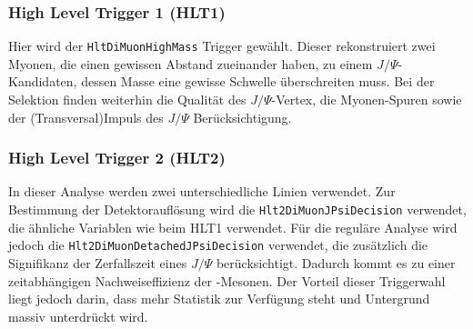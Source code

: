 \subsubsection{High Level Trigger 1 (HLT1)}
Hier wird der \texttt{HltDiMuonHighMass} Trigger gewählt. Dieser rekonstruiert zwei Myonen, die einen gewissen Abstand zueinander haben, zu einem $J/\Psi$-Kandidaten, dessen Masse eine gewisse Schwelle überschreiten muss. Bei der Selektion finden weiterhin die Qualität des $J/\Psi$-Vertex, die Myonen-Spuren sowie der (Transversal)Impuls des $J/\Psi$ Berücksichtigung.

\subsubsection{High Level Trigger 2 (HLT2)}
In dieser Analyse werden zwei unterschiedliche Linien verwendet. Zur Bestimmung der Detektorauflösung wird die \texttt{Hlt2\-DiMuon\-JPsi\-Decision} verwendet, die ähnliche Variablen wie beim HLT1 verwendet. Für die reguläre Analyse wird jedoch die \texttt{Hlt2\-DiMuon\-Detached\-JPsi\-Decision} verwendet, die zusätzlich die Signifikanz der Zerfallszeit eines $J/\Psi$ berücksichtigt. Dadurch kommt es zu einer zeitabhängigen Nachweiseffizienz der \Bd-Mesonen. Der Vorteil dieser Triggerwahl liegt jedoch darin, dass mehr Statistik zur Verfügung steht und Untergrund massiv unterdrückt wird.

